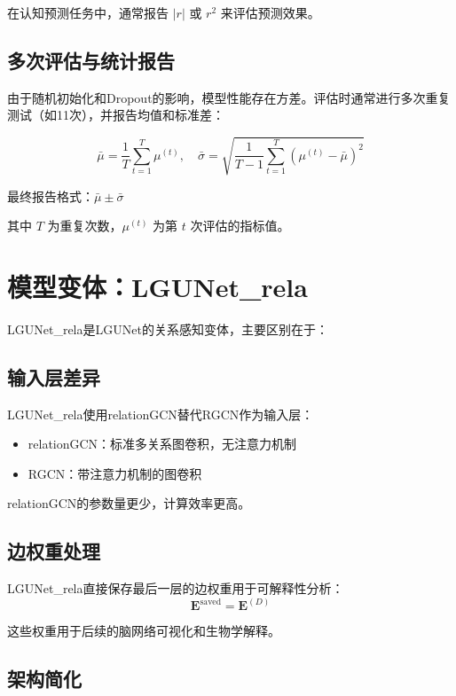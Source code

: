 \documentclass[UTF8, a4paper, 12pt]{article}
\begin{document}
在认知预测任务中，通常报告 $|r|$ 或 $r^2$ 来评估预测效果。

\subsection{多次评估与统计报告}

由于随机初始化和Dropout的影响，模型性能存在方差。评估时通常进行多次重复测试（如11次），并报告均值和标准差：

\begin{equation}
\bar{\mu} = \frac{1}{T} \sum_{t=1}^{T} \mu^{(t)}, \quad \bar{\sigma} = \sqrt{ \frac{1}{T-1} \sum_{t=1}^{T} (\mu^{(t)} - \bar{\mu})^2 }
\end{equation}

最终报告格式：$\bar{\mu} \pm \bar{\sigma}$

其中 $T$ 为重复次数，$\mu^{(t)}$ 为第 $t$ 次评估的指标值。

\newpage

\section{模型变体：LGUNet\_rela}

LGUNet\_rela是LGUNet的关系感知变体，主要区别在于：

\subsection{输入层差异}

LGUNet\_rela使用relationGCN替代RGCN作为输入层：
\begin{itemize}
    \item relationGCN：标准多关系图卷积，无注意力机制
    \item RGCN：带注意力机制的图卷积
\end{itemize}

relationGCN的参数量更少，计算效率更高。

\subsection{边权重处理}

LGUNet\_rela直接保存最后一层的边权重用于可解释性分析：
\begin{equation}
\mathbf{E}^{\text{saved}} = \mathbf{E}^{(D)}
\end{equation}

这些权重用于后续的脑网络可视化和生物学解释。

\subsection{架构简化}
\end{document}
